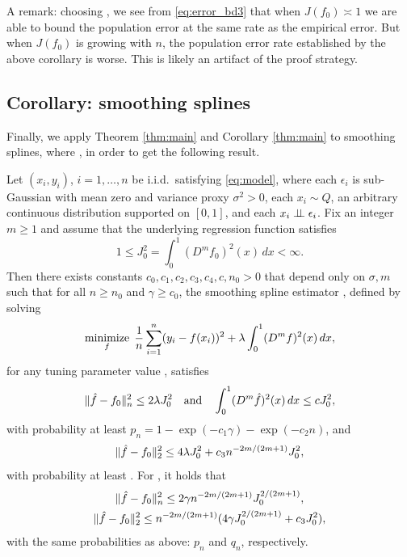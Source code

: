 \documentclass{article}
\begin{document}
A remark: choosing , we see from \eqref{eq:error_bd3} that when $J(f_0) \asymp 1$ we are
able to bound the population error at the same rate  as
the empirical error. But when $J(f_0)$ is growing with $n$, the population
error rate established by the above corollary is worse. This is likely an
artifact of the proof strategy.  

\subsection{Corollary: smoothing splines}

Finally, we apply Theorem \ref{thm:main} and Corollary \ref{thm:main} to
smoothing splines, where , in order 
to get the following result.  

\begin{corollary}
\label{cor:ss}
Let $(x_i,y_i)$, $i=1,\dots,n$ be i.i.d.\ satisfying \eqref{eq:model}, where
each $\epsilon_i$ is sub-Gaussian with mean zero and variance proxy
$\sigma^2>0$, each $x_i \sim Q$, an arbitrary continuous distribution supported
on $[0,1]$, and each $x_i \perp\!\!\!\perp \epsilon_i$. Fix an integer $m \geq 1$ and
assume that the underlying regression function satisfies  
\[
1 \leq  J_0^2 = \int_0^1 (D^m f_0)^2(x) \, dx < \infty.
\]
Then there exists constants $c_0,c_1,c_2,c_3,c_4,c,n_0>0$ that depend only on     
$\sigma,m$ such that for all $n \geq n_0$ and $\gamma \geq c_0$, the
smoothing spline estimator \smash{$\hf$}, defined by solving
\[
\mathop{\mathrm{minimize}}_f \; \frac{1}{n} \sum_{i=1}^n (y_i - f(x_i))^2 + \lambda \int_0^1 (D^m
f)^2(x) \, dx, 
\]
for any tuning parameter value , satisfies       
\[
\|\hat{f} - f_0\|_n^2 \leq 2 \lambda J_0^2\quad \text{and} \quad 
\int_0^1 (D^m \hat{f})^2(x) \, dx \leq c J_0^2, 
\]
with probability at least $p_n = 1 - \exp(-c_1\gamma) - \exp(-c_2n)$, and
\[
\|\hat{f} - f_0\|_2^2 \leq 4 \lambda J_0^2 + c_3 n^{-2m/(2m+1)} J_0^2,
\]
with probability at least . For , it holds that
\begin{gather*}
\|\hat{f} - f_0\|_n^2 \leq 2 \gamma n^{-2m/(2m+1)} J_0^{2/(2m+1)}, \\
\|\hat{f} - f_0\|_2^2 \leq n^{-2m/(2m+1)} (4 \gamma J_0^{2/(2m+1)} + c_3 J_0^2), 
\end{gather*}
with the same probabilities as above: $p_n$ and $q_n$, respectively.
\end{corollary}
\end{document}
